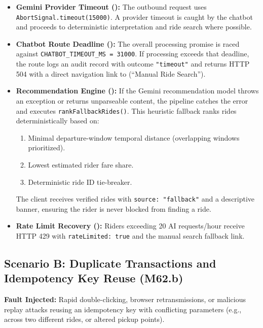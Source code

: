 \documentclass[10pt]{article}
\begin{document}
\begin{itemize}
  \item \textbf{Gemini Provider Timeout ():} The outbound request uses \texttt{AbortSignal.timeout(15000)}. A provider timeout is caught by the chatbot and proceeds to deterministic interpretation and ride search where possible.
  \item \textbf{Chatbot Route Deadline ():} The overall processing promise is raced against \texttt{CHATBOT\_TIMEOUT\_MS = 31000}. If processing exceeds that deadline, the route logs an audit record with outcome \texttt{"timeout"} and returns HTTP 504 with a direct navigation link to  (``Manual Ride Search'').
  \item \textbf{Recommendation Engine ():} If the Gemini recommendation model throws an exception or returns unparseable content, the pipeline catches the error and executes \texttt{rankFallbackRides()}. This heuristic fallback ranks rides deterministically based on:
    \begin{enumerate}
      \item Minimal departure-window temporal distance (overlapping windows prioritized).
      \item Lowest estimated rider fare share.
      \item Deterministic ride ID tie-breaker.
    \end{enumerate}
    The client receives verified rides with \texttt{source: "fallback"} and a descriptive banner, ensuring the rider is never blocked from finding a ride.
  \item \textbf{Rate Limit Recovery ():} Riders exceeding 20 AI requests/hour receive HTTP 429 with \texttt{rateLimited: true} and the manual search fallback link.
\end{itemize}

\subsection{Scenario B: Duplicate Transactions and Idempotency Key Reuse (M62.b)}
\textbf{Fault Injected:} Rapid double-clicking, browser retransmissions, or malicious replay attacks reusing an idempotency key with conflicting parameters (e.g., across two different rides, or altered pickup points).
\end{document}
